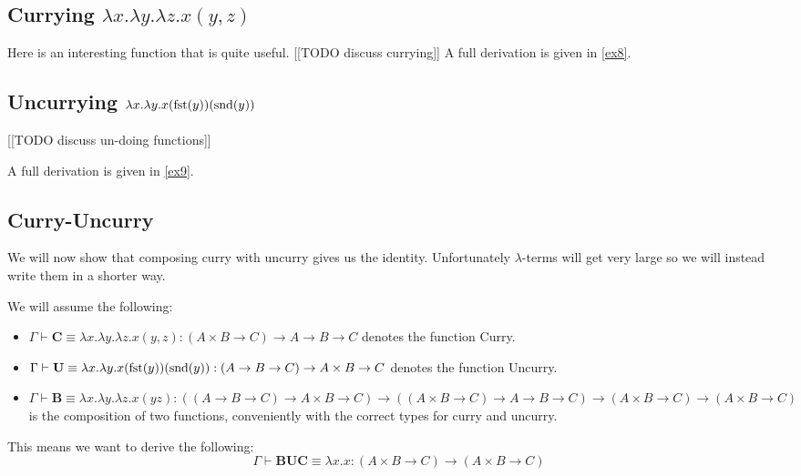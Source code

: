 \begin{example}
\begin{example}
\end{example}



\subsection{Currying $\lambda x . \lambda y . \lambda z . x (y, z)$} %
Here is an interesting function that is quite useful.
[[TODO discuss currying]]
A full derivation is given in \ref{ex8}.

\subsection{Uncurrying $\lambda x . \lambda y . x (\mathrm{fst}(y))(\mathrm{snd}(y))$} %
[[TODO discuss un-doing functions]]

A full derivation is given in \ref{ex9}.

\subsection{Curry-Uncurry}

We will now show that composing curry with uncurry gives us the identity. Unfortunately $\lambda$-terms will get very large so we will instead write them in a shorter way.
\begin{example}\label{curry_uncurry}
    We will assume the following:
    \begin{itemize}
    \item $\Gamma \vdash \mathbf{C} \equiv \lambda x . \lambda y . \lambda z . x (y, z) : (A \times B \to C) \to A \to B \to C$ denotes the function Curry.    
    \item $\Gamma \vdash \mathbf{U} \equiv \lambda x . \lambda y . x (\mathrm{fst}(y))(\mathrm{snd}(y)) : (A \to B \to C) \to A \times B \to C$ denotes the function Uncurry.
    \item $\Gamma \vdash \mathbf{B} \equiv \lambda x . \lambda y . \lambda z . x ( y z) : ((A \to B \to C) \to A \times B \to C) \to ((A \times B \to C) \to A \to B \to C) \to (A \times B \to C) \to (A \times B \to C)$ is the composition of two functions, conveniently with the correct types for curry and uncurry.
    \end{itemize}

    This means we want to derive the following:
    $$
        \Gamma \vdash \mathbf{B} \mathbf{U} \mathbf{C} \equiv \lambda x . x : (A \times B \to C) \to (A \times B \to C)
    $$
    

\end{example}
\end{example}
